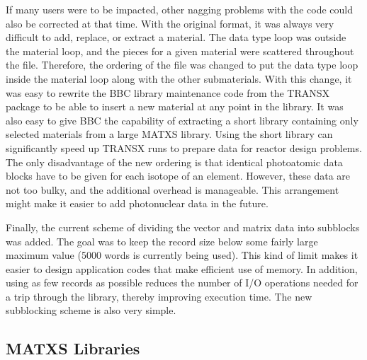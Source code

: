 If many users were to be impacted, other nagging problems with the code
could also be corrected at that time.  With the original format, it was
always very difficult to add, replace, or extract a material.  The data
type loop was outside the material loop, and the pieces for a given
material were scattered throughout the file.  Therefore, the ordering
of the file was changed to put the data type loop inside the material
loop along with the other submaterials.  With this change, it was easy
to rewrite the BBC library maintenance code from the TRANSX package
to be able to insert a new material at any point in the library.
It was also easy to give BBC the capability of extracting a short
library containing only selected materials from a large MATXS
library.  Using the short library can significantly speed
up TRANSX runs to prepare data for reactor design problems.  The only
disadvantage of the new ordering is that identical photoatomic data
blocks have to be given for each isotope of an element.  However,
these data are not too bulky, and the additional overhead is manageable.
This arrangement might make it easier to add photonuclear data in the
future.

Finally, the current scheme of dividing the vector and matrix data into
subblocks was added.  The goal was to keep the record size below some
fairly large maximum value (5000 words is currently being used).  This
kind of limit makes it easier to design application codes that make
efficient use of memory.  In addition, using as few records as possible
reduces the number of I/O operations needed for a trip through the
library, thereby improving execution time.  The new subblocking scheme
is also very simple.

\subsection{MATXS Libraries}
\label{ssMATXSR_libraries}

